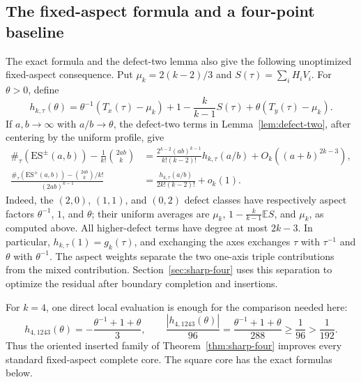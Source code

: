 \documentclass[11pt,letterpaper]{article}
\begin{document}
\subsection{The fixed-aspect formula and a four-point baseline}
The exact formula and the defect-two lemma also give the following
unoptimized fixed-aspect consequence.  Put
$\mu_k=2(k-2)/3$ and $S(\tau)=\sum_iH_iV_i$.  For $\theta>0$, define
\begin{equation}\label{eq:h-local}
 h_{k,\tau}(\theta)
 =\theta^{-1}(T_x(\tau)-\mu_k)
  +1-\frac{k}{k-1}S(\tau)
  +\theta(T_y(\tau)-\mu_k).
\end{equation}
If $a,b\to\infty$ with $a/b\to\theta$, the defect-two terms in
Lemma~\ref{lem:defect-two}, after centering by the uniform profile, give
\begin{align}
 \#_\tau(\mathrm{ES}^{\pm}(a,b))
 -\frac1{k!}\binom{2ab}{k}
 &=\frac{2^{k-2}(ab)^{k-1}}{k!(k-2)!}
   h_{k,\tau}(a/b)+O_k((a+b)^{2k-3}),
 \label{eq:rectangular-leading}\\
 \frac{\#_\tau(\mathrm{ES}^{\pm}(a,b))-\binom{2ab}{k}/k!}{(2ab)^{k-1}}
 &=\frac{h_{k,\tau}(a/b)}{2k!(k-2)!}+o_k(1).
 \label{eq:rectangular-leading-normalized}
\end{align}
Indeed, the $(2,0)$, $(1,1)$, and $(0,2)$ defect classes have respectively
aspect factors $\theta^{-1}$, $1$, and $\theta$; their uniform averages are
$\mu_k$, $1-\frac{k}{k-1}\mathbb E S$, and $\mu_k$, as computed above.
All higher-defect terms have degree at most $2k-3$.  In particular,
$h_{k,\tau}(1)=g_k(\tau)$, and exchanging the axes exchanges $\tau$ with
$\tau^{-1}$ and $\theta$ with $\theta^{-1}$.  The aspect weights separate the two one-axis triple contributions from
the mixed contribution.  Section~\ref{sec:sharp-four} uses this separation
to optimize the residual after boundary completion and insertions.

For $k=4$, one direct local evaluation is enough for the comparison needed
here:
\[
 h_{4,1243}(\theta)=-\frac{\theta^{-1}+1+\theta}{3},
 \qquad
 \frac{|h_{4,1243}(\theta)|}{96}
 =\frac{\theta^{-1}+1+\theta}{288}\geq\frac1{96}>\frac1{192}.
\]
Thus the oriented inserted family of Theorem~\ref{thm:sharp-four} improves
every standard fixed-aspect complete core.  The square core has the exact
formulas below.
\end{document}
